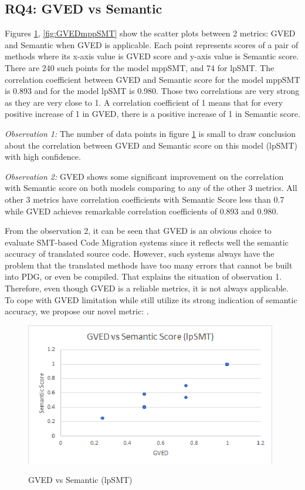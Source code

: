 \subsection{RQ4: GVED vs Semantic}
Figures \ref{fig:GVEDlpSMT}, \ref{fig:GVEDmppSMT}  show the scatter plots between 2 metrics: GVED and Semantic when GVED is applicable. Each point represents scores of a pair of methods where its x-axis value is GVED score and y-axis value is Semantic score. There are 240 such points for the model mppSMT, and 74 for lpSMT. 
The correlation coefficient between GVED and Semantic score for the model mppSMT is 0.893 and for the model lpSMT is 0.980. Those two correlations are very strong as they are very close to 1. A correlation coefficient of 1 means that for every positive increase of 1 in GVED, there is a positive increase of 1 in Semantic score. 

\emph{Observation 1:} The number of data points in figure \ref{fig:GVEDlpSMT} is small to draw conclusion about the correlation between GVED and Semantic score on this model (lpSMT) with high confidence. 

\emph{Observation 2:} GVED shows some significant improvement on the correlation with Semantic score on both models comparing to any of the other 3 metrics. All other 3 metrics have correlation coefficients with Semantic Score less than 0.7 while GVED achieves remarkable correlation coefficients of 0.893 and 0.980. 

From the observation 2, it can be seen that GVED is an obvious choice to evaluate SMT-based Code Migration systems since it reflects well the semantic accuracy of translated source code.  However, such systems always have the problem that the translated methods have too many errors that cannot be built into PDG, or even be compiled. That explains the situation of observation 1. Therefore, even though GVED is a reliable metrics, it is not always applicable. To cope with GVED limitation while still utilize its strong indication of semantic accuracy, we propose our novel metric: {\model}. 

\begin{figure}
\caption{GVED vs Semantic (lpSMT)}
\centering
\includegraphics{img/gved_lpSMT.png}
\label{fig:GVEDlpSMT}
\end{figure}


